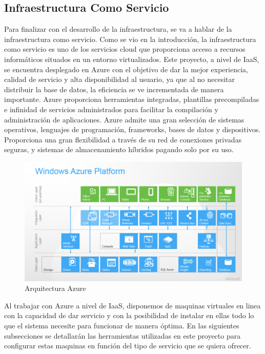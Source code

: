 \documentclass[a4paper,11pt]{book}
\begin{document}
\subsection{Infraestructura Como Servicio}
Para finalizar con el desarrollo de la infraestructura, se va a hablar de la infraestructura como servicio. Como se vio en la introducción, la infraestructura como servicio es uno de los servicios cloud que proporciona acceso a recursos informáticos situados en un entorno virtualizados. Este proyecto, a nivel de IaaS, se encuentra desplegado en Azure\cite{azure} con el objetivo de  dar la mejor experiencia, calidad de servicio y alta disponibilidad al usuario, ya que al no necesitar distribuir la base de datos, la eficiencia se ve incrementada de manera importante.
Azure proporciona herramientas integradas, plantillas precompiladas e infinidad de servicios administrados para facilitar la compilación y administración de aplicaciones. Azure admite una gran selección de sistemas operativos, lenguajes de programación, frameworks, bases de datos y dispositivos. Proporciona una gran flexibilidad a través de su red de conexiones privadas seguras, y sistemas de almacenamiento híbridos pagando solo por su uso. 

\begin{figure}[H] 
\centering 
\includegraphics[scale=0.50]{imagenes/desarrollo_herramienta/azure.png}
\caption{ Arquitectura Azure\cite{azureA}  }  
\end{figure}

Al trabajar con Azure a nivel de IaaS, disponemos de maquinas virtuales en linea con la capacidad de dar servicio y con la posibilidad de instalar en ellas todo lo que el sistema necesite para funcionar de manera óptima. En las siguientes subsecciones se detallarán las herramientas utilizadas en este proyecto para configurar estas maquinas en función del tipo de servicio que se quiera ofrecer. 
\end{document}
